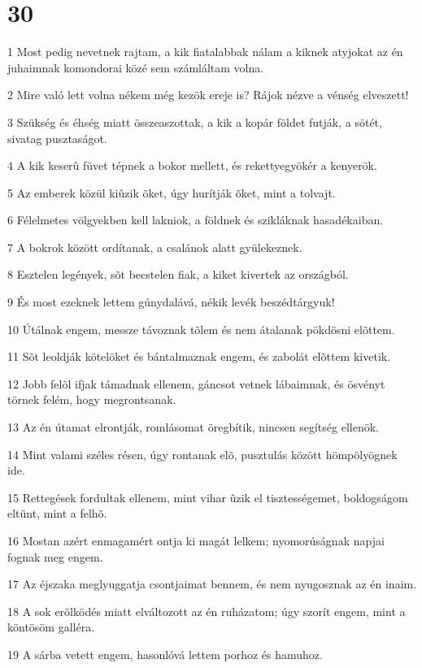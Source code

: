 \chapter{30}

\par 1 Most pedig nevetnek rajtam, a kik fiatalabbak nálam a kiknek atyjokat az én juhaimnak komondorai közé sem számláltam volna.
\par 2 Mire való lett volna nékem még kezök ereje is? Rájok nézve a vénség elveszett!
\par 3 Szükség és éhség miatt összeaszottak, a kik a kopár földet futják, a sötét, sivatag pusztaságot.
\par 4 A kik keserû füvet tépnek a bokor mellett, és rekettyegyökér a kenyerök.
\par 5 Az emberek közül kiûzik õket, úgy hurítják õket, mint a tolvajt.
\par 6 Félelmetes völgyekben kell lakniok, a földnek és szikláknak hasadékaiban.
\par 7 A bokrok között ordítanak, a csalánok alatt gyülekeznek.
\par 8 Esztelen legények, sõt becstelen fiak, a kiket kivertek az országból.
\par 9 És most ezeknek lettem gúnydalává, nékik levék beszédtárgyuk!
\par 10 Útálnak engem, messze távoznak tõlem és nem átalanak pökdösni elõttem.
\par 11 Sõt leoldják kötelöket és bántalmaznak engem, és zabolát elõttem kivetik.
\par 12 Jobb felõl ifjak támadnak ellenem, gáncsot vetnek lábaimnak, és ösvényt törnek felém, hogy megrontsanak.
\par 13 Az én útamat elrontják, romlásomat öregbítik, nincsen segítség ellenök.
\par 14 Mint valami széles résen, úgy rontanak elõ, pusztulás között hömpölyögnek ide.
\par 15 Rettegések fordultak ellenem, mint vihar ûzik el tisztességemet, boldogságom eltünt, mint a felhõ.
\par 16 Mostan azért enmagamért ontja ki magát lelkem; nyomorúságnak napjai fognak meg engem.
\par 17 Az éjszaka meglyuggatja csontjaimat bennem, és nem nyugosznak az én inaim.
\par 18 A sok erõlködés miatt elváltozott az én ruházatom; úgy szorít engem, mint a köntösöm galléra.
\par 19 A sárba vetett engem, hasonlóvá lettem porhoz és hamuhoz.
